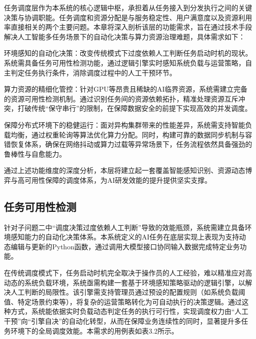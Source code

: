 任务调度层作为本系统的核心逻辑中枢，承担着从任务接入到分发执行之间的关键决策与协调职能。任务调度和资源分配是与服务稳定性、用户满意度以及资源利用率直接相关的两个主要问题\cite{pan2025}。本章将深入剖析该层的功能需求，旨在通过技术手段解决人工智能多任务场景下的自动化决策与算力资源治理难题，具体需求如下：

环境感知的自动化决策：改变传统模式下过度依赖人工判断任务启动时机的现状。系统需具备任务可用性检测功能，通过逻辑引擎实时感知系统负载与运营策略，自主判定任务执行条件，消除调度过程中的人工干预环节。

算力资源的精细化管控：针对GPU等昂贵且稀缺的AI临界资源，系统需建立完备的资源可用性检测机制。通过识别任务间的资源依赖拓扑，精准处理资源互斥冲突，打破传统“保守串行”的限制，在保障数据安全的前提下实现高效的并发调度。

保障分布式环境下的稳健运行：面对异构集群带来的性能差异，系统需支持智能负载均衡，通过权重轮询等算法优化算力分配。同时，构建可靠的数据同步机制与容错恢复体系，确保在网络抖动或算力过载等异常场景下，任务流程依然具备强劲的鲁棒性与自愈能力。

通过上述功能维度的深度分析，本层将建立起一套覆盖智能感知识别、资源动态博弈与高可用性保障的调度体系，为AI研发效能的提升提供坚实支撑。

\subsection{任务可用性检测}

针对子问题二中“调度决策过度依赖人工判断”导致的效能瓶颈，系统需建立具备环境感知能力的自动化决策体系。本系统定义的AI任务在底层实现上表现为支持动态编辑与更新的Python函数，通过调用大模型接口协同输入数据完成特定业务功能。

在传统调度模式下，任务启动时机完全取决于操作员的人工经验，难以精准应对高动态的系统负载环境，系统亟需构建一套基于环境感知策略驱动的逻辑引擎，以解决人工判断的局限性。该引擎需支持管理员通过预设的配置规则（如系统负载阈值、特定场景约束等），将复杂的运营策略转化为可自动执行的决策逻辑。通过这种方式，系统能依据实时负载动态判定任务的执行可行性，实现调度权力由“人工干预”向“引擎自决”的自动化转型，从而在保障业务连续性的同时，显著提升多任务环境下的全局调度效能。本需求的用例表如表3.2所示。

